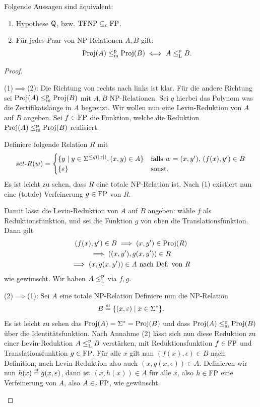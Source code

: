\begin{theorem}\label{thm:q-as-levin}
    Folgende Aussagen sind äquivalent:
    \begin{enumerate}
        \item Hypothese $\mathsf{Q}$, bzw. $\mathrm{TFNP}\subseteq_\mathrm{c}\mathrm{FP}$. 
        \item Für jedes Paar von NP-Relationen $A, B$ gilt:
            \[ \operatorname{Proj}(A) \leq_\mathrm{m}^\mathrm{p} \operatorname{Proj}(B) \iff A \leq_\mathrm{L}^\mathrm{p} B. \]
    \end{enumerate}
\end{theorem}
\begin{proof}
    \begin{prooflist}
\item (1)$\implies$(2): Die Richtung von rechts nach links ist klar. Für die andere Richtung sei $\operatorname{Proj}(A) \leq_\mathrm{m}^\mathrm{p} \operatorname{Proj}(B)$ mit $A,B$ NP-Relationen. Sei $q$ hierbei das Polynom was die Zertifikatslänge in $A$ begrenzt.
    Wir wollen nun eine Levin-Reduktion von $A$ auf $B$ angeben. Sei $f\in \mathrm{FP}$ die Funktion, welche die Reduktion $\operatorname{Proj}(A) \leq_\mathrm{m}^\mathrm{p} \operatorname{Proj}(B)$ realisiert.

    Definiere folgende Relation $R$ mit
    \[ \mathit{set}\text{-}{}R(w) = \begin{cases} \{ y\mid y\in\Sigma^{\leq q(|x|)}, (x,y)\in A \} & \text{falls $w=(x,y')$, $(f(x), y')\in B$} \\  \{\varepsilon\} & \text{sonst}. \end{cases} \]
    Es ist leicht zu sehen, dass $R$ eine totale NP-Relation ist. Nach (1) existiert nun eine (totale) Verfeinerung $g\in \mathrm{FP}$ von $R$.

    Damit lässt die Levin-Reduktion von $A$ auf $B$ angeben: wähle $f$ als Reduktionsfunktion, und sei die Funktion $g$ von oben die Translationsfunktion. Dann gilt
    \begin{gather*}
        (f(x), y') \in B \implies (x, y')\in\operatorname{Proj}(R) \\
        \implies ((x, y'), g(x, y'))\in R\\
        \implies (x, g(x, y')) \in A \text{ nach Def. von $R$}
    \end{gather*}
    wie gewünscht. Wir haben $A\leq_\mathrm{L}^\mathrm{p}$ via $f, g$.
\item (2)$\implies$(1): Sei $A$ eine totale NP-Relation
    Definiere nun die NP-Relation
    \[ B \stackrel{\text{\smash{\tiny df}}}{=} \{ (x, \varepsilon) \mid x\in\Sigma^* \}. \]
    Es ist leicht zu sehen das $\operatorname{Proj}(A)=\Sigma^*=\operatorname{Proj}(B)$ und dass $\operatorname{Proj}(A)\leq_\mathrm{m}^\mathrm{p}\operatorname{Proj}(B)$ über die Identitätsfunktion.
    Nach Annahme (2) lässt sich nun diese Reduktion zu einer Levin-Reduktion $A\leq_\mathrm{L}^\mathrm{p} B$ verstärken, mit Reduktionsfunktion $f\in\mathrm{FP}$ und  Translationsfunktion $g\in\mathrm{FP}$.
    Für alle $x$ gilt nun $(f(x),\epsilon)\in B$ nach Definition,
    nach Levin-Reduktion also auch $(x, g(x, \epsilon))\in A$.
    Definieren wir nun $h(x)\stackrel{\text{\smash{\tiny df}}}{=} g(x,\varepsilon)$, dann ist $(x, h(x))\in A$ für alle $x$, also $h\in\mathrm{FP}$ eine Verfeinerung von $A$, also $A\in_\mathrm{c} \mathrm{FP}$, wie gewünscht.
\end{prooflist}
\end{proof}


